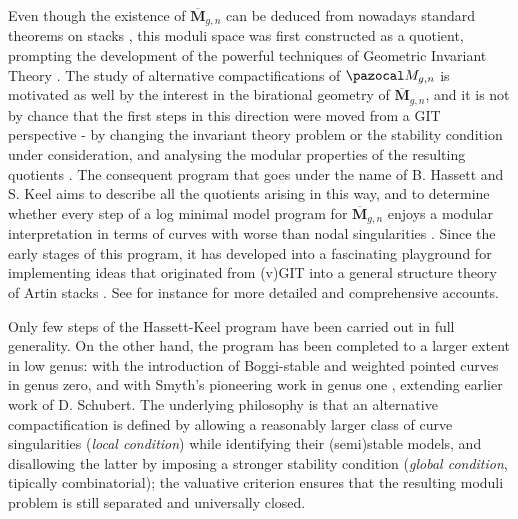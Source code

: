 \documentclass[11pt]{amsart}
\theoremstyle{plain}
\theoremstyle{definition}
\begin{document}
Even though the existence of $\overline{\mathbf M}_{g,n}$ can be deduced from nowadays standard theorems on stacks \cite{KM}, this moduli space was first constructed as a quotient, prompting the development of the powerful techniques of Geometric Invariant Theory  \cite{Gieseker,GIT,BalSwi}. The study of alternative compactifications of $\pazocal M_{g,n}$ is motivated as well by the interest in the birational geometry of $\overline{\mathbf M}_{g,n}$, and it is not by chance that the first steps in this direction were moved from a GIT perspective - by changing the invariant theory problem or the stability condition under consideration, and analysing the modular properties of the resulting quotients \cite{Schubert,Hassettg2,HassettHyeon}. The consequent program that goes under the name of B. Hassett and S. Keel aims to describe all the quotients arising in this way, and to determine whether every step of a log minimal model program for $\overline{\mathbf M}_{g,n}$ enjoys a modular interpretation in terms of curves with worse than nodal singularities \cite{CTV1,CTV2}. Since the early stages of this program, it has developed into a fascinating playground for implementing ideas that originated from (v)GIT into a general structure theory of Artin stacks \cite{AlperKresch,AFS1,AFS2,AFS3}. See for instance \cite{Morrison, FS} for more detailed and comprehensive accounts.

Only few steps of the Hassett-Keel program have been carried out in full generality. On the other hand, the program has been completed to a larger extent in low genus: with the introduction of Boggi-stable \cite{Boggi} and weighted pointed curves \cite{Hassettweighted} in genus zero, and with Smyth's pioneering work in genus one \cite{SMY1,SMY2,SMY3}, extending earlier work of D. Schubert. The underlying philosophy is that an alternative compactification is defined by allowing a reasonably larger class of curve singularities (\emph{local condition}) while identifying their (semi)stable models, and disallowing the latter by imposing a stronger stability condition (\emph{global condition}, tipically combinatorial); the valuative criterion ensures that the resulting moduli problem is still separated and universally closed.
\end{document}
